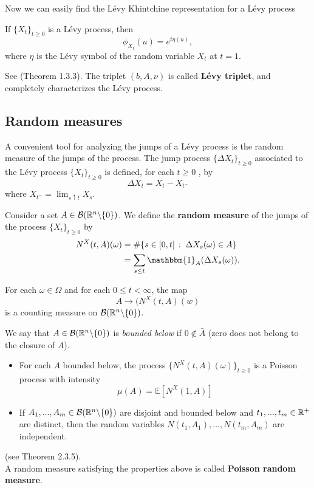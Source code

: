 Now we can easily find the Lévy Khintchine representation for a Lévy process
\begin{Theorem}
 If $\{X_t\}_{t \ge 0}$ is a Lévy process, then
 \begin{equation}\label{Levy_Kint}
  \phi_{X_t}(u) = e^{t \eta(u)},
 \end{equation}
where $\eta$ is the Lévy symbol of the random variable $X_t$ at $t=1$.
\end{Theorem}
See \cite{Applebaum} (Theorem 1.3.3).
The triplet $(b, A, \nu)$ is called \textbf{Lévy triplet}, and completely characterizes the Lévy process.

\subsection{Random measures}\label{random_measures}

A convenient tool for analyzing the jumps of a Lévy process is the random
measure of the jumps of the process.
The jump process $\{\Delta X_t\}_{t \ge 0}$ associated to the Lévy process $\{X_t\}_{t \ge 0}$ is
defined, for each $t \geq 0$ , by
\begin{equation}\label{jump}
 \Delta X_t = X_t - X_{t^-}
\end{equation}
where $X_{t^-} = \lim_{s\uparrow t} X_s $.\\ 
\begin{Definition}
Consider a set $A \in \mathcal{B}(\mathbb{R}^n \backslash \{ 0 \})$.
We define the \textbf{random measure} of the jumps of the process $\{X_t\}_{t \ge 0}$ by
\begin{align}
 N^X(t,A)(\omega) &= \# \{ s \in [0,t] \, : \; \Delta X_s(\omega) \in A  \} \\
		   &= \sum_{s\leq t} \mathbbm{1}_A(\Delta X_s(\omega)) . \nonumber
\end{align} 
\end{Definition}
For each $\omega \in \Omega$ and for each $0 \leq t < \infty$, the map 
$$ A \to (N^X(t,A)(w) $$ 
is a counting measure on $\mathcal{B}(\mathbb{R}^n \backslash \{ 0 \})$. %

We say that $A\in \mathcal{B}(\mathbb{R}^n \backslash \{ 0 \})$ is \emph{bounded below} if $0 \not \in \bar A$ (zero does not belong to the closure of $A$). 

\begin{itemize}
 \item For each $A$ bounded below, the process $\bigl \{ N^X(t,A)(\omega) \bigr \}_{t\geq 0}$ is a Poisson process with intensity 
 \begin{equation}
 \mu(A) = \mathbb{E}[N^X(1,A) ] 
 \end{equation}
 \item If $A_1, ..., A_m \in \mathcal{B}(\mathbb{R}^n \backslash \{ 0 \})$ are disjoint and bounded below and $t_1, ..., t_m \in \mathbb{R}^+$ are distinct, then
 the random variables $N(t_1,A_1), ..., N(t_m,A_m)$ are independent.
\end{itemize}
(see \cite{Applebaum} Theorem 2.3.5). \\
A random measure satisfying the properties above is called \textbf{Poisson random measure}.

